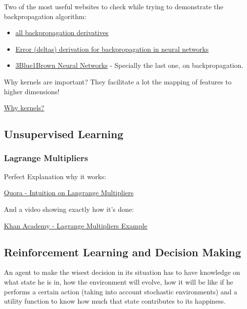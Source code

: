 Two of the most useful websites to check while trying to demonstrate the backpropagation algorithm:
\begin{itemize}
    \item \href{https://medium.com/@pdquant/all-the-backpropagation-derivatives-d5275f727f60}{\ul{all backpropagation derivatives}}
    \item \href{https://stats.stackexchange.com/questions/94387/how-to-derive-errors-in-neural-network-with-the-backpropagation-algorithm}{\ul{Error (deltas) derivation for backpropagation in neural networks}}
    \item \href{https://www.youtube.com/playlist?list=PLZHQObOWTQDNU6R1_67000Dx_ZCJB-3pi}{3Blue1Brown Neural Networks} - Specially the last one, on backpropagation.
    
\end{itemize}



Why kernels are important? They facilitate a lot the mapping of features to higher dimensions!

\href{https://medium.com/@zxr.nju/what-is-the-kernel-trick-why-is-it-important-98a98db0961d}{\ul{Why kernels?}}



\subsection{Unsupervised Learning}

\subsubsection{Lagrange Multipliers}

Perfect Explanation why it works:

\href{https://www.quora.com/Why-does-the-method-of-Lagrange-multipliers-work-for-optimization-in-multivariable-calculus-Why-exactly-given-a-function-f-x-y-and-a-constraint-g-x-y-c-can-we-set-the-gradients-of-the-functions-to-be-multiples-of-each-other}{\ul{Quora - Intuition on Langrange Multipliers}}

And a video showing exactly how it's done:

\href{https://www.youtube.com/watch?v=yuqB-d5MjZA}{\ul{Khan Academy - Lagrange Multipliers Example}}



\subsection{Reinforcement Learning and Decision Making}


An agent to make the wisest decision in its situation has to have knowledge on what state he is in, how the environment will evolve, how it will be like if he performs a certain action (taking into account stochastic environments) and a utility function to  know how much that state contributes to its happiness.


